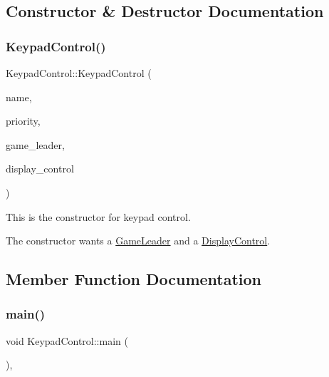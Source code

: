 \subsection{Constructor \& Destructor Documentation}
\mbox{\label{class_keypad_control_ade69a59ba2a34bde40809433952cb153}} 
\subsubsection{\texorpdfstring{Keypad\+Control()}{KeypadControl()}}
{\footnotesize\ttfamily Keypad\+Control\+::\+Keypad\+Control (\begin{DoxyParamCaption}\item[{const char $\ast$}]{name,  }\item[{int}]{priority,  }\item[{\mbox{\hyperlink{class_game_leader}{Game\+Leader}} \&}]{game\+\_\+leader,  }\item[{\mbox{\hyperlink{class_display_control}{Display\+Control}} \&}]{display\+\_\+control }\end{DoxyParamCaption})\hspace{0.3cm}{\ttfamily [inline]}}



This is the constructor for keypad control. 

The constructor wants a \mbox{\hyperlink{class_game_leader}{Game\+Leader}} and a \mbox{\hyperlink{class_display_control}{Display\+Control}}. 

\subsection{Member Function Documentation}
\mbox{\label{class_keypad_control_a66ec8a33eceb20d5d1d243c270c3718b}} 
\subsubsection{\texorpdfstring{main()}{main()}}
{\footnotesize\ttfamily void Keypad\+Control\+::main (\begin{DoxyParamCaption}{ }\end{DoxyParamCaption})\hspace{0.3cm}{\ttfamily [inline]}, {\ttfamily [override]}}



